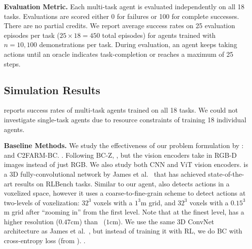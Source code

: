 \textbf{Evaluation Metric.} Each multi-task agent is evaluated independently on all 18 tasks. Evaluations are scored either 0 for failures or 100 for complete successes. There are no partial credits. We report average success rates on 25 evaluation episodes per task ($25 \times18 = 450$ total episodes) for agents trained with $n=10,100$ demonstrations per task. During evaluation, an agent keeps taking actions until an oracle indicates task-completion or reaches a maximum of 25 steps.

\vspace{-0.2cm}
\subsection{Simulation Results}
\label{sec:sim_results}
\vspace{-0.1cm}

 reports success rates of multi-task agents trained on all 18 tasks. 
We could not investigate single-task agents due to resource constraints of training 18 individual agents. 

\textbf{Baseline Methods.} We study the effectiveness of our problem formulation by : \bcz and C2FARM-BC.
. Following BC-Z, , but the vision encoders take in RGB-D images instead of just RGB. We also  study both CNN and ViT vision encoders. \unet is a 3D fully-convolutional network by James et al.~\citep{c2farm} that has achieved state-of-the-art results on RLBench tasks. Similar to our agent, \unet also detects actions in a voxelized space, however it uses a coarse-to-fine-grain scheme to detect actions at two-levels of voxelization: $32^3$ voxels with a $1^3$m grid, and $32^3$ voxels with a $0.15^3$m grid after ``zooming in'' from the first level. Note that at the finest level, \unet has a higher resolution ($0.47$cm) than \model~($1$cm). We use the same 3D ConvNet architecture as James et al.~\citep{c2farm}, but instead of training it with RL, we do BC with cross-entropy loss (from ). . 

